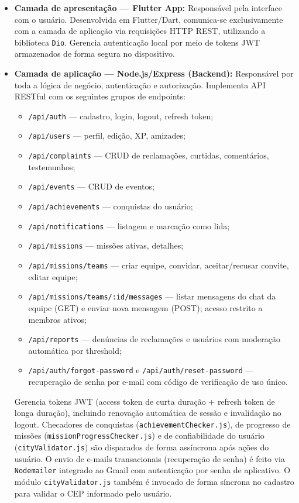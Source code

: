 \begin{itemize}
  \item \textbf{Camada de apresentação — Flutter App:} Responsável pela
        interface com o usuário. Desenvolvida em Flutter/Dart, comunica-se
        exclusivamente com a camada de aplicação via requisições HTTP REST,
        utilizando a biblioteca \texttt{Dio}. Gerencia autenticação local por
        meio de tokens JWT armazenados de forma segura no dispositivo.

  \item \textbf{Camada de aplicação — Node.js/Express (Backend):} Responsável
        por toda a lógica de negócio, autenticação e autorização. Implementa
        API RESTful com os seguintes grupos de endpoints:
        \begin{itemize}
          \item \texttt{/api/auth} — cadastro, login, logout, refresh token;
          \item \texttt{/api/users} — perfil, edição, XP, amizades;
          \item \texttt{/api/complaints} — CRUD de reclamações, curtidas, comentários, testemunhos;
          \item \texttt{/api/events} — CRUD de eventos;
          \item \texttt{/api/achievements} — conquistas do usuário;
          \item \texttt{/api/notifications} — listagem e marcação como lida;
          \item \texttt{/api/missions} — missões ativas, detalhes;
          \item \texttt{/api/missions/teams} — criar equipe, convidar, aceitar/recusar convite, editar equipe;
          \item \texttt{/api/missions/teams/:id/messages} — listar mensagens do chat da equipe (GET) e enviar nova mensagem (POST); acesso restrito a membros ativos;
          \item \texttt{/api/reports} — denúncias de reclamações e usuários com moderação automática por threshold;
          \item \texttt{/api/auth/forgot-password} e \texttt{/api/auth/reset-password} — recuperação de senha por e-mail com código de verificação de uso único.
        \end{itemize}
        Gerencia tokens JWT (access token de curta duração + refresh token de
        longa duração), incluindo renovação automática de sessão e invalidação
        no logout. Checadores de conquistas (\texttt{achievementChecker.js}),
        de progresso de missões (\texttt{missionProgressChecker.js}) e de
        confiabilidade do usuário (\texttt{cityValidator.js}) são disparados
        de forma assíncrona após ações do usuário. O envio de e-mails
        transacionais (recuperação de senha) é feito via \texttt{Nodemailer}
        integrado ao Gmail com autenticação por senha de aplicativo. O
        módulo \texttt{cityValidator.js} também é invocado de forma síncrona
        no cadastro para validar o CEP informado pelo usuário.


\end{itemize}
